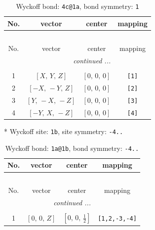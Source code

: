 \documentclass[fleqn,8pt]{jsarticle}
\begin{document}
\renewcommand{\arraystretch}{1.2}
\begin{longtable}{cccc}
\caption{Wyckoff bond: {\tt 4c@1a}, bond symmetry: {\tt 1}}
 \\
 \hline \hline
No. & vector & center & mapping \\ \hline \endfirsthead

\multicolumn{3}{l}{\tablename\ \thetable{}} \\
 \hline \hline
No. & vector & center & mapping \\ \hline \endhead

 \hline \hline
\multicolumn{3}{r}{\footnotesize\it continued ...} \\ \endfoot

 \hline \hline
\multicolumn{3}{r}{} \\ \endlastfoot

1 & $\left[ X,\, Y,\, Z \right]$ & $\left[ 0,\, 0,\, 0 \right]$ & {\tt [1]} \\ \hline
2 & $\left[ - X,\, - Y,\, Z \right]$ & $\left[ 0,\, 0,\, 0 \right]$ & {\tt [2]} \\ \hline
3 & $\left[ Y,\, - X,\, - Z \right]$ & $\left[ 0,\, 0,\, 0 \right]$ & {\tt [3]} \\ \hline
4 & $\left[ - Y,\, X,\, - Z \right]$ & $\left[ 0,\, 0,\, 0 \right]$ & {\tt [4]} \\
\end{longtable}
* Wyckoff site: {\tt 1b}, site symmetry: {\tt -4..}
\renewcommand{\arraystretch}{1.2}
\begin{longtable}{cccc}
\caption{Wyckoff bond: {\tt 1a@1b}, bond symmetry: {\tt -4..}}
 \\
 \hline \hline
No. & vector & center & mapping \\ \hline \endfirsthead

\multicolumn{3}{l}{\tablename\ \thetable{}} \\
 \hline \hline
No. & vector & center & mapping \\ \hline \endhead

 \hline \hline
\multicolumn{3}{r}{\footnotesize\it continued ...} \\ \endfoot

 \hline \hline
\multicolumn{3}{r}{} \\ \endlastfoot

1 & $\left[ 0,\, 0,\, Z \right]$ & $\left[ 0,\, 0,\, \frac{1}{2} \right]$ & {\tt [1,2,-3,-4]} \\
\end{longtable}
\renewcommand{\arraystretch}{1.2}
\end{document}
